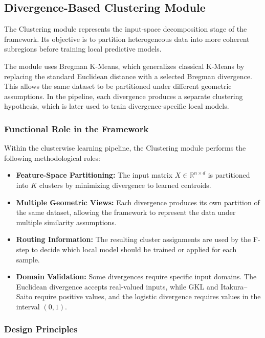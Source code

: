 \subsection{Divergence-Based Clustering Module}

\hs The Clustering module represents the input-space decomposition stage of the \KFCProcedure{} framework. Its objective is to partition heterogeneous data into more coherent subregions before training local predictive models.

The module uses Bregman K-Means, which generalizes classical K-Means by replacing the standard Euclidean distance with a selected Bregman divergence. This allows the same dataset to be partitioned under different geometric assumptions. In the \KFCProcedure{} pipeline, each divergence produces a separate clustering hypothesis, which is later used to train divergence-specific local models.


\subsubsection*{Functional Role in the Framework}

Within the clusterwise learning pipeline, the Clustering module performs the following methodological roles:

\begin{itemize}
    \item \textbf{Feature-Space Partitioning:} The input matrix $X \in \mathbb{R}^{n \times d}$ is partitioned into $K$ clusters by minimizing divergence to learned centroids.

    \item \textbf{Multiple Geometric Views:} Each divergence produces its own partition of the same dataset, allowing the framework to represent the data under multiple similarity assumptions.

    \item \textbf{Routing Information:} The resulting cluster assignments are used by the F-step to decide which local model should be trained or applied for each sample.

    \item \textbf{Domain Validation:} Some divergences require specific input domains. The Euclidean divergence accepts real-valued inputs, while GKL and Itakura--Saito require positive values, and the logistic divergence requires values in the interval $(0,1)$.
\end{itemize}

\subsubsection*{Design Principles}

